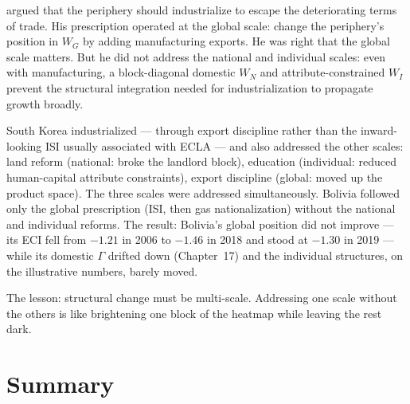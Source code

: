 \documentclass[../structural_economics_book.tex]{subfiles}
\begin{document}
\begin{prebisch}
\citet{prebisch1949desarrollo} argued that the periphery should industrialize to escape the deteriorating terms of trade. His prescription operated at the global scale: change the periphery's position in $W_G$ by adding manufacturing exports. He was right that the global scale matters. But he did not address the national and individual scales: even with manufacturing, a block-diagonal domestic $W_N$ and attribute-constrained $W_I$ prevent the structural integration needed for industrialization to propagate growth broadly.

South Korea industrialized --- through export discipline rather than the inward-looking ISI usually associated with ECLA --- and also addressed the other scales: land reform (national: broke the landlord block), education (individual: reduced human-capital attribute constraints), export discipline (global: moved up the product space). The three scales were addressed simultaneously. Bolivia followed only the global prescription (ISI, then gas nationalization) without the national and individual reforms. The result: Bolivia's global position did not improve --- its ECI fell from $-1.21$ in 2006 to $-1.46$ in 2018 and stood at $-1.30$ in 2019 \citep{growthlab2026atlas} --- while its domestic $\Gamma$ drifted down (Chapter~17) and the individual structures, on the illustrative numbers, barely moved.

The lesson: structural change must be multi-scale. Addressing one scale without the others is like brightening one block of the heatmap while leaving the rest dark.
\end{prebisch}


\section{Summary}
\label{ch19:sec:summary}
\end{document}
